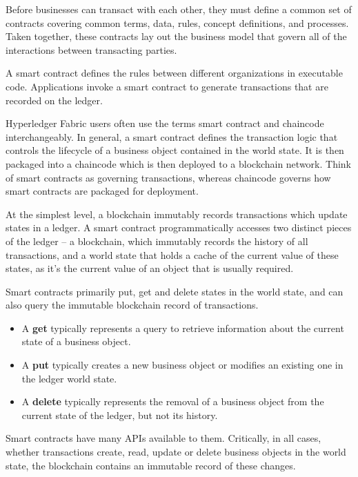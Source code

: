 Before businesses can transact with each other, they must define a common set of contracts covering common terms, data, rules, concept definitions, and processes. Taken together, these contracts lay out the business model that govern all of the interactions between transacting parties.

A smart contract defines the rules between different organizations in executable code. Applications invoke a smart contract to generate transactions that are recorded on the ledger.

Hyperledger Fabric users often use the terms smart contract and chaincode interchangeably. In general, a smart contract defines the transaction logic that controls the lifecycle of a business object contained in the world state. It is then packaged into a chaincode which is then deployed to a blockchain network. Think of smart contracts as governing transactions, whereas chaincode governs how smart contracts are packaged for deployment.

At the simplest level, a blockchain immutably records transactions which update states in a ledger. A smart contract programmatically accesses two distinct pieces of the ledger – a blockchain, which immutably records the history of all transactions, and a world state that holds a cache of the current value of these states, as it’s the current value of an object that is usually required.

Smart contracts primarily put, get and delete states in the world state, and can also query the immutable blockchain record of transactions.

\begin{itemize}
\item A \textbf{get} typically represents a query to retrieve information about the current state of a business object.
\item A \textbf{put} typically creates a new business object or modifies an existing one in the ledger world state.
\item A \textbf{delete} typically represents the removal of a business object from the current state of the ledger, but not its history.
\end{itemize}

Smart contracts have many APIs available to them. Critically, in all cases, whether transactions create, read, update or delete business objects in the world state, the blockchain contains an immutable record of these changes.

